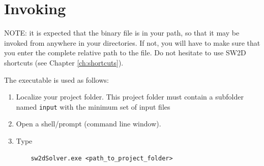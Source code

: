 \section{Invoking \swSolver}
NOTE: it is expected that the binary file \swSolver is in your path, so that it may be invoked from anywhere in your directories. If not, you will have to make sure that you enter the complete relative path to the \swSolver file. Do not hesitate to use SW2D shortcuts (see Chapter \ref{ch:shortcuts}).

The \swSolver executable is used as follows:

\begin{enumerate}
	\item Localize your project folder. This project folder must contain a subfolder named \texttt{input} with the minimum set of input files
	\item Open a shell/prompt (command line window).
	\item Type
	\begin{verbatim}
	sw2dSolver.exe <path_to_project_folder>
	\end{verbatim}
\end{enumerate}
